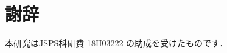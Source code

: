 \documentclass[uplatex,dvipdfmx,a4paper,twocolumn,base=11pt,jbase=11pt,ja=standard]{bxjsarticle}  %
\newcommand{\todo}[1]{\colorbox{yellow}{{\bf TODO}:}{\color{red} {\textbf{[#1]}}}}
\begin{document}











\section*{謝辞}

本研究はJSPS科研費 18H03222 の助成を受けたものです．













\end{document}
